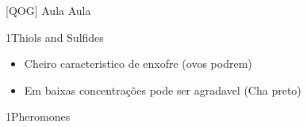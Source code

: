 \documentclass[\mainfilename]{subfiles}
\begin{document}
[QOG]
{Aula}
{Aula}


\begin{sectionBox}1{Thiols and Sulfides}
    
    \begin{itemize}
        \item Cheiro caracteristico de enxofre (ovos podrem)
        \item Em baixas concentrações pode ser agradavel (Cha preto)
    \end{itemize}
    
\end{sectionBox}

\begin{sectionBox}1{Pheromones}
    

\end{sectionBox}
\end{document}
